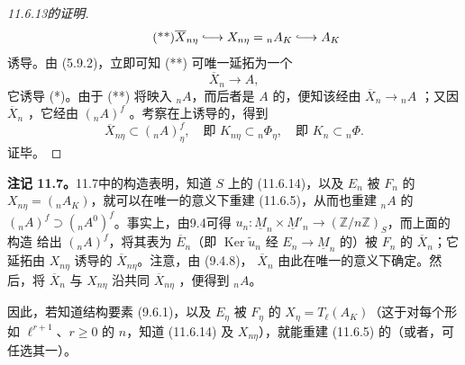 \begin{proof}[11.6.13的证明]
\begin{equation}\tag{**}
 \overline X_{n\eta}\lhook\joinrel\longrightarrow X_{n\eta}
 ={}_nA_K\lhook\joinrel\longrightarrow A_K
\end{equation}
诱导。由 (5.9.2)，立即可知 (**) 可唯一延拓为一个
\begin{equation}\tag{***}
 \overline X_n\longrightarrow A,
\end{equation}
它诱导 (*)。由于 (**) 将映入 ${}_nA$，而后者是 $A$ 的，便知该经由 $\overline X_n\longrightarrow{}_nA$ ；又因 $\overline X_n$ ，它经由 $({}_nA)^f$ 。考察在上诱导的，得到
\[
 \overline X_{n\eta}\subset({}_nA)^f_\eta,
 \quad\text{即 }K_{n\eta}\subset{}_n\Phi_\eta,
 \quad\text{即 }K_n\subset{}_n\Phi.
\]
证毕。
\end{proof}

\textbf{注记 11.7。}11.7中的构造表明，知道 $S$ 上的 (11.6.14)，以及 $E_n$ 被 $F_n$ 的 $X_{n\eta}=({}_nA_K)$，就可以在唯一的意义下重建 (11.6.5)，从而也重建 ${}_nA$ 的 $({}_nA)^f\supset({}_nA^0)^f$。事实上，由9.4可得 $u_n:\underline M_n\times\underline M'_n\longrightarrow(\mathbb Z/n\mathbb Z)_S$，而上面的构造
给出 $({}_nA)^f$，将其表为 $\overline E_n$（即 $\operatorname{Ker}\widetilde u_n$ 经 $E_n\longrightarrow\underline M_n$ 的）被 $F_n$ 的 $\overline X_n$；它延拓由 $X_{n\eta}$ 诱导的 $\overline X_{n\eta}$。注意，由 (9.4.8)， $\overline X_n$ 由此在唯一的意义下确定。然后，将 $\overline X_n$ 与 $X_{n\eta}$ 沿共同 $\overline X_{n\eta}$ ，便得到 ${}_nA$。

因此，若知道结构要素 (9.6.1)，以及 $E_\eta$ 被 $F_\eta$ 的 $X_\eta=T_\ell(A_K)$（这于对每个形如 $\ell^{r+1}$、$r\ge0$ 的 $n$，知道 (11.6.14) 及 $X_{n\eta}$），就能重建 (11.6.5) 的（或者，可任选其一）。

